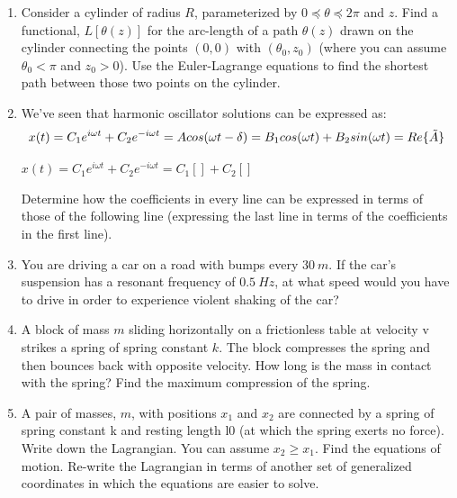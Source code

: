 \documentclass[fleqn]{article}
\begin{document}
\begin{enumerate}
    \item Consider a cylinder of radius $R$, parameterized by $0\preceq \theta \preceq 2\pi$ and $z$.
    Find a functional, $L\left[\theta(z)\right]$  for the arc-length of a path $\theta(z)$
    drawn on the cylinder connecting the points $(0,0)$ with $(\theta_0, z_0)$ (where you can
    assume $\theta_0 < \pi$ and $z_0 >0$). Use the Euler-Lagrange equations to find
    the shortest path between those two points on the cylinder.

    \item We’ve seen that harmonic oscillator solutions can be expressed as: 
    $$
    x(t)=C_1 e^{i\omega t}+C_2 e^{-i \omega t} \\
    =A cos(\omega t-\delta) \\
    =B_1 cos(\omega t)+B_2 sin(\omega t) \\
    =Re\{\tilde{A} \}
    $$

    \textcolor{hwColor}{
      $
        x(t)=C_1 e^{i\omega t}+C_2 e^{-i \omega t}=C_1 \left[\right]+C_2 \left[\right]
      $
    }

    Determine how the coefficients in every line can be expressed in terms
    of those of the following line (expressing the last line in terms of the
    coefficients in the first line).

    \item You are driving a car on a road with bumps every $30 ~ m$. If the car’s
    suspension has a resonant frequency of $0.5 ~ Hz$, at what speed would
    you have to drive in order to experience violent shaking of the car?


    \item A block of mass $m$ sliding horizontally on a frictionless table at velocity
    v strikes a spring of spring constant $k$. The block compresses the spring
    and then bounces back with opposite velocity. How long is the mass in
    contact with the spring? Find the maximum compression of the spring.


    \item A pair of masses, $m$, with positions $x_1$ and $x_2$ are connected by a spring
    of spring constant k and resting length l0 (at which the spring exerts no
    force). Write down the Lagrangian. You can assume $x_2 ≥ x_1$. Find the
    equations of motion. Re-write the Lagrangian in terms of another set
    of generalized coordinates in which the equations are easier to solve.


\end{enumerate}
\end{document}
